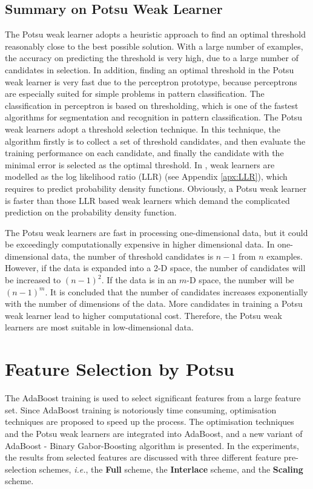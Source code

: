 \subsection{Summary on Potsu Weak Learner}
The Potsu weak learner adopts a heuristic approach to find an optimal threshold reasonably close to the best possible solution. With a large number of examples, the accuracy on predicting the threshold is very high, due to a large number of candidates in selection. In addition, finding an optimal threshold in the Potsu weak learner is very fast due to the perceptron prototype, because perceptrons are especially suited for simple problems in pattern classification. The classification in perceptron is based on thresholding, which is one of the fastest algorithms for segmentation and recognition in pattern classification.
The Potsu weak learners adopt a threshold selection technique. In this technique, the algorithm firstly is to collect a set of threshold candidates, and then evaluate the training performance on each candidate, and finally the candidate with the minimal error is selected as the optimal threshold.  In \cite{Friedman2000,LiStan2004,Schapire1998}, weak learners are modelled as the log likelihood ratio (LLR) (see \mbox{Appendix} \ref{apx:LLR}), which requires to predict probability density functions. Obviously, a Potsu weak learner is faster than those LLR based weak learners which demand the complicated prediction on the probability density function.

The Potsu weak learners are fast in processing one-dimensional data, but it could be exceedingly computationally expensive in higher dimensional data. In one-dimensional data, the number of threshold candidates is $n-1$ from $n$ examples. However, if the data is expanded into a 2-D space, the number of candidates will be increased to $(n-1)^2$. If the data is in an $m$-D space, the number will be $(n-1)^m$. It is concluded that the number of candidates increases exponentially with the number of dimensions of the data. More candidates in training a Potsu weak learner lead to higher computational cost. Therefore, the Potsu weak learners are most suitable in low-dimensional data.



\section{Feature Selection by Potsu}
\label{sec:POTSUfeatureselection}
The AdaBoost training is used to select significant features from a large feature set. Since AdaBoost training is notoriously time consuming, optimisation techniques are proposed to speed up the process. The optimisation techniques and the Potsu weak learners are integrated into AdaBoost, and a new variant of AdaBoost - Binary Gabor-Boosting algorithm is presented. In the experiments, the results from selected features are discussed with three different feature pre-selection schemes, \textit{i.e.}, the \textbf{Full} scheme, the \textbf{Interlace} scheme, and the \textbf{Scaling} scheme.

